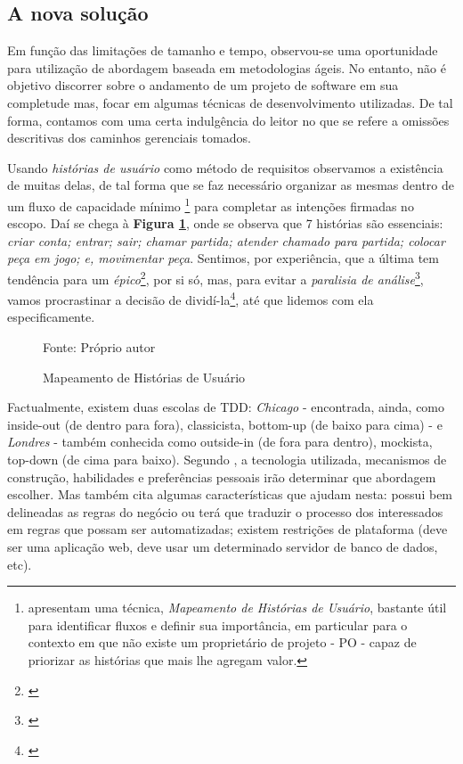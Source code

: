 \subsection{A nova solução}

  Em função das limitações de tamanho e tempo, observou-se uma oportunidade para utilização de abordagem baseada em metodologias ágeis. No entanto, não é objetivo discorrer sobre o andamento de um projeto de software em sua completude mas, focar em algumas técnicas de desenvolvimento utilizadas. De tal forma, contamos com uma certa indulgência do leitor no que se refere a omissões descritivas dos caminhos gerenciais tomados.

  Usando \emph{histórias de usuário} como método de requisitos observamos a existência de muitas delas, de tal forma que se faz necessário organizar as mesmas dentro de um fluxo de capacidade mínimo \footnote{ apresentam uma técnica, \emph{Mapeamento de Histórias de Usuário}, bastante útil para identificar fluxos e definir sua importância, em particular para o contexto em que não existe um proprietário de projeto - PO - capaz de priorizar as histórias que mais lhe agregam valor.} para completar as intenções firmadas no escopo. Daí se chega à \textbf{Figura \ref{fig:mapeamento-historias-usuario}}, onde se observa que 7 histórias são essenciais: \emph{criar conta; entrar; sair; chamar partida; atender chamado para partida; colocar peça em jogo; e, movimentar peça}. Sentimos, por experiência, que a última tem tendência para um \emph{épico}\footnote{\cite[pág. 6]{Cohn2004}}, por si só, mas,  para evitar a \emph{paralisia de análise}\footnote{\cite[pág. 71]{Pugh2011}}, vamos procrastinar a decisão de dividí-la\footnote{\cite[pág. 24]{Cohn2004}}, até que lidemos com ela especificamente.

  \begin{figure}[h]
    \centering
    \caption{Mapeamento de Histórias de Usuário}
    Fonte: Próprio autor
    \label{fig:mapeamento-historias-usuario}
  \end{figure}

  Factualmente, existem duas escolas de TDD: \emph{Chicago} - encontrada, ainda, como inside-out (de dentro para fora), classicista, bottom-up (de baixo para cima) - e \emph{Londres} - também conhecida como outside-in (de fora para dentro), mockista, top-down (de cima para baixo). Segundo , a tecnologia utilizada, mecanismos de construção, habilidades e preferências pessoais irão determinar que abordagem escolher. Mas também cita algumas características que ajudam nesta: possui bem delineadas as regras do negócio ou terá que traduzir o processo dos interessados em regras que possam ser automatizadas; existem restrições de plataforma (deve ser uma aplicação web, deve usar um determinado servidor de banco de dados, etc).

